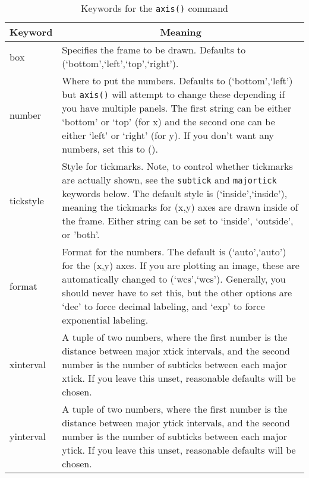 \documentclass[12pt]{article}
\begin{document}
\begin{table}
\caption{\label{tab:axis} Keywords for the \texttt{axis()} command}
\begin{center}
\begin{tabular}{lp{4in}}
\hline
\hline
\multicolumn{1}{c}{Keyword} & \multicolumn{1}{c}{Meaning}\\
\hline
box       & Specifies the frame to be drawn.  Defaults to
            \mbox{(`bottom',`left',`top',`right')}.\\
number    & Where to put the numbers.  Defaults to (`bottom',`left')
            but \texttt{axis()} will attempt to change these
            depending if you have multiple panels.  The first string
            can be either `bottom' or `top' (for x) and the second
            one can be either `left' or `right' (for y).  If you
            don't want any numbers, set this to ().\\
tickstyle & Style for tickmarks.  Note, to control whether tickmarks
            are actually shown, see the \texttt{subtick} and \texttt{majortick}
            keywords below.  The default style is (`inside',`inside'), meaning
            the tickmarks for (x,y) axes are drawn inside of the
            frame.  Either string can be set to `inside', `outside',
            or 'both'.\\
format    & Format for the numbers.  The default is (`auto',`auto')
            for the (x,y) axes.  If you are plotting an image, these
            are automatically changed to (`wcs',`wcs').  Generally, you should
            never have to set this, but the other options are `dec'
            to force decimal labeling, and `exp' to force exponential
            labeling.\\
xinterval & A tuple of two numbers, where the first number is the
            distance between major xtick intervals, and the second
            number is the number of subticks between each major xtick.
            If you leave this unset, reasonable defaults will be
            chosen.\\
yinterval & A tuple of two numbers, where the first number is the
            distance between major ytick intervals, and the second
            number is the number of subticks between each major ytick.
            If you leave this unset, reasonable defaults will be
            chosen.\\
\hline
\end{tabular}
\end{center}
\end{table}
\end{document}
